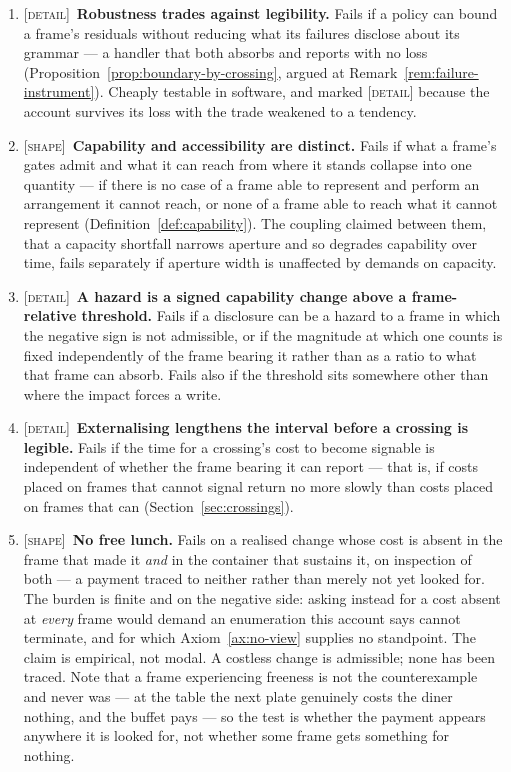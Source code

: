\documentclass[11pt,a4paper]{article}
\theoremstyle{remark}\newtheorem{remark}[definition]{Remark}
\begin{document}
\begin{enumerate}[leftmargin=*]
\item \textsc{[detail]}~\textbf{Robustness trades against legibility.} Fails if a policy can bound a frame's residuals without reducing what its failures disclose about its grammar --- a handler that both absorbs and reports with no loss (Proposition~\ref{prop:boundary-by-crossing}, argued at Remark~\ref{rem:failure-instrument}). Cheaply testable in software, and marked \textsc{[detail]} because the account survives its loss with the trade weakened to a tendency.
\item \textsc{[shape]}~\textbf{Capability and accessibility are distinct.} Fails if what a frame's gates admit and what it can reach from where it stands collapse into one quantity --- if there is no case of a frame able to represent and perform an arrangement it cannot reach, or none of a frame able to reach what it cannot represent (Definition~\ref{def:capability}). The coupling claimed between them, that a capacity shortfall narrows aperture and so degrades capability over time, fails separately if aperture width is unaffected by demands on capacity.
\item \textsc{[detail]}~\textbf{A hazard is a signed capability change above a frame-relative threshold.} Fails if a disclosure can be a hazard to a frame in which the negative sign is not admissible, or if the magnitude at which one counts is fixed independently of the frame bearing it rather than as a ratio to what that frame can absorb. Fails also if the threshold sits somewhere other than where the impact forces a write.
\item \textsc{[detail]}~\textbf{Externalising lengthens the interval before a crossing is legible.} Fails if the time for a crossing's cost to become signable is independent of whether the frame bearing it can report --- that is, if costs placed on frames that cannot signal return no more slowly than costs placed on frames that can (Section~\ref{sec:crossings}).
\item \textsc{[shape]}~\textbf{No free lunch.} Fails on a realised change whose cost is absent in the frame that made it \emph{and} in the container that sustains it, on inspection of both --- a payment traced to neither rather than merely not yet looked for. The burden is finite and on the negative side: asking instead for a cost absent at \emph{every} frame would demand an enumeration this account says cannot terminate, and for which Axiom~\ref{ax:no-view} supplies no standpoint. The claim is empirical, not modal. A costless change is admissible; none has been traced. Note that a frame experiencing freeness is not the counterexample and never was --- at the table the next plate genuinely costs the diner nothing, and the buffet pays --- so the test is whether the payment appears anywhere it is looked for, not whether some frame gets something for nothing.

\end{enumerate}
\end{document}
